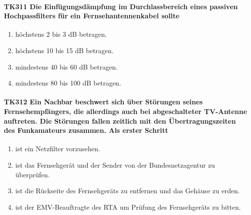 \documentclass[8pt]{article}
\begin{document}
\paragraph*{TK311 Die Einfügungsdämpfung im Durchlassbereich eines passiven Hochpassfilters für ein Fernsehantennenkabel sollte}
\begin{enumerate}[nolistsep,label=\Alph*]
\item höchstens 2 bis 3 dB betragen.
\item höchstens 10 bis 15 dB betragen.
\item mindestens 40 bis 60 dB betragen.
\item mindestens 80 bis 100 dB betragen.
\end{enumerate}

\paragraph*{TK312 Ein Nachbar beschwert sich über Störungen seines Fernsehempfängers, die allerdings auch bei abgeschalteter TV-Antenne auftreten. Die Störungen fallen zeitlich mit den Übertragungszeiten des Funkamateurs zusammen. Als erster Schritt}
\begin{enumerate}[nolistsep,label=\Alph*]
\item ist ein Netzfilter vorzusehen.
\item ist das Fernsehgerät und der Sender von der Bundesnetzagentur zu überprüfen.
\item ist die Rückseite des Fernsehgeräts zu entfernen und das Gehäuse zu erden.
\item ist der EMV-Beauftragte des RTA um Prüfung des Fernsehgeräts zu bitten.
\end{enumerate}
\end{document}
